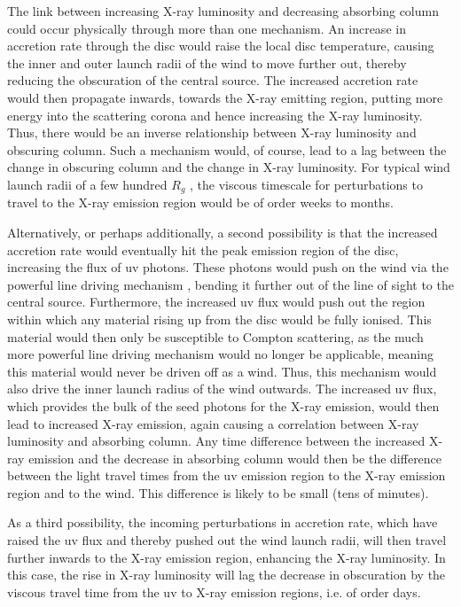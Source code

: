 \documentclass[useAMS,usenatbib]{sam}
\begin{document}

The link between increasing X-ray luminosity and decreasing absorbing column could occur physically through more than one mechanism. An increase in accretion rate through
the disc would raise the local disc temperature, causing the inner and outer launch radii of the wind to move further out, thereby reducing the obscuration of the central
source. The increased accretion rate would then propagate inwards, towards the X-ray emitting region, putting more energy into the scattering corona and hence increasing
the X-ray luminosity. Thus, there would be an inverse relationship between X-ray luminosity and obscuring column. Such a mechanism would, of course, lead to a lag between
the change in obscuring column and the change in X-ray luminosity. For typical wind launch radii of a few hundred $R_g$ \citep{higginbottom}, the viscous timescale for
perturbations to travel to the X-ray emission region would be of order weeks to months. 

Alternatively, or perhaps additionally, a second possibility is that the increased accretion rate would eventually hit the peak emission region of the disc, increasing
the flux of uv photons. These photons would push on the wind via the powerful line driving mechanism \citep{proga99}, bending it further out of the line of sight to the
central source. Furthermore, the increased uv flux would push out the region within which any material rising up from the disc would be fully ionised. This material would
then only be susceptible to Compton scattering, as the much more powerful line driving mechanism would no longer be applicable, meaning this material would never be
driven off as a wind. Thus, this mechanism would also drive the inner launch radius of the wind outwards. The increased uv flux, which provides the bulk of the seed
photons for the X-ray emission, would then lead to increased X-ray emission, again causing a correlation between X-ray luminosity and absorbing column. Any time
difference between the increased X-ray emission and the decrease in absorbing column would then be the difference between the light travel times from the uv emission
region to the X-ray emission region and to the wind. This difference is likely to be small (tens of minutes). 

As a third possibility, the incoming perturbations in accretion rate, which have raised the uv flux and thereby pushed out the wind launch radii, will then travel further
inwards to the X-ray emission region, enhancing the X-ray luminosity. In this case, the rise in X-ray luminosity will lag the decrease in obscuration by the viscous
travel time from the uv to X-ray emission regions, i.e. of order days.
\end{document}
